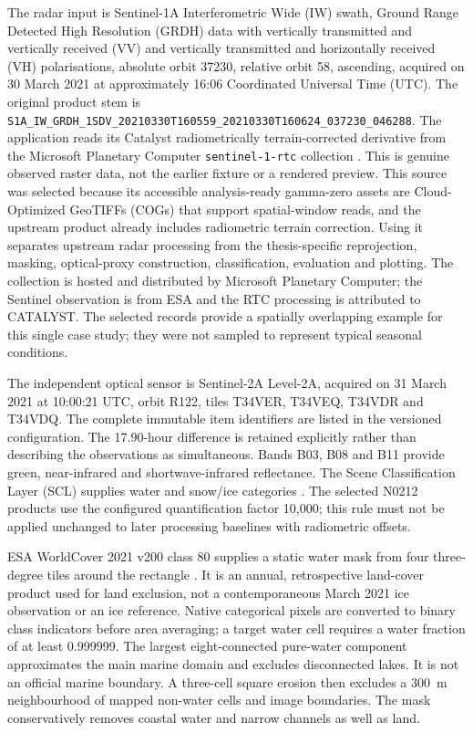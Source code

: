 The radar input is Sentinel-1A Interferometric Wide (IW) swath, Ground Range Detected
High Resolution (GRDH) data with vertically transmitted and vertically received (VV) and
vertically transmitted and horizontally received (VH) polarisations, absolute orbit 37230,
relative orbit 58, ascending, acquired on 30 March 2021 at approximately 16:06 Coordinated
Universal Time (UTC).
The original product stem is
\nolinkurl{S1A_IW_GRDH_1SDV_20210330T160559_20210330T160624_037230_046288}.
The application reads its Catalyst radiometrically terrain-corrected derivative from the
Microsoft Planetary Computer \texttt{sentinel-1-rtc} collection \citep{pc-s1-rtc}.
This is genuine observed raster data, not the earlier fixture or a rendered preview.
This source was selected because its accessible analysis-ready gamma-zero assets are
Cloud-Optimized GeoTIFFs (COGs) that support spatial-window reads, and the upstream product
already includes radiometric terrain correction. Using it separates upstream radar processing
from the thesis-specific reprojection, masking, optical-proxy construction, classification,
evaluation and plotting. The collection is hosted and distributed by Microsoft Planetary
Computer; the Sentinel observation is from ESA and the RTC processing is attributed to
CATALYST. The selected records provide a spatially overlapping example for this single
case study; they were not sampled to represent typical seasonal conditions.

The independent optical sensor is Sentinel-2A Level-2A, acquired on 31 March 2021 at
10:00:21 UTC, orbit R122, tiles T34VER, T34VEQ, T34VDR and T34VDQ.
The complete immutable item identifiers are listed in the versioned configuration.
The 17.90-hour difference is retained explicitly rather than describing the observations
as simultaneous. Bands B03, B08 and B11 provide green, near-infrared and shortwave-infrared
reflectance. The Scene Classification Layer (SCL) supplies water and snow/ice categories
\citep{s2-processing}. The selected N0212 products use the configured quantification
factor 10,000; this rule must not be applied unchanged to later processing baselines
with radiometric offsets.

ESA WorldCover 2021 v200 class 80 supplies a static water mask from four three-degree
tiles around the rectangle \citep{worldcover2021}. It is an annual, retrospective land-cover
product used for land exclusion, not a contemporaneous March 2021 ice observation or an ice
reference. Native categorical pixels are converted to binary class indicators before
area averaging; a target water cell requires a water fraction of at least 0.999999.
The largest eight-connected pure-water component approximates the main marine domain and
excludes disconnected lakes. It is not an official marine boundary. A three-cell square
erosion then excludes a 300~m neighbourhood of mapped non-water cells and image boundaries.
The mask conservatively removes coastal water and narrow channels as well as land.

